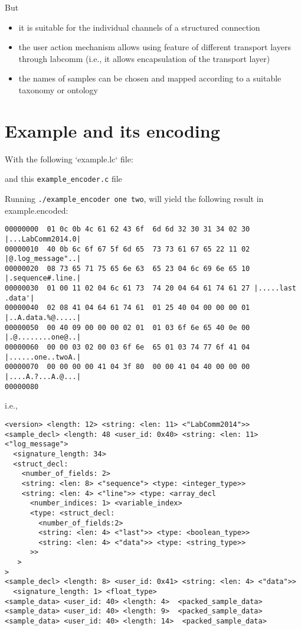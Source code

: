\documentclass[a4paper]{article}
\begin{document}
But

\begin{itemize}
\item it is suitable for the individual channels of a structured connection
\item the user action mechanism allows using feature of different transport layers
  through labcomm (i.e., it allows encapsulation of the transport layer)
\item the names of samples can be chosen and mapped according to a suitable taxonomy or ontology
\end{itemize}



\section{Example and its encoding}

With the following `example.lc` file:


and this \verb+example_encoder.c+ file



Running \verb+./example_encoder one two+, will yield the following result in example.encoded:
\begin{verbatim}
00000000  01 0c 0b 4c 61 62 43 6f  6d 6d 32 30 31 34 02 30 |...LabComm2014.0|
00000010  40 0b 6c 6f 67 5f 6d 65  73 73 61 67 65 22 11 02 |@.log_message"..|
00000020  08 73 65 71 75 65 6e 63  65 23 04 6c 69 6e 65 10 |.sequence#.line.|
00000030  01 00 11 02 04 6c 61 73  74 20 04 64 61 74 61 27 |.....last .data'|
00000040  02 08 41 04 64 61 74 61  01 25 40 04 00 00 00 01 |..A.data.%@.....|
00000050  00 40 09 00 00 00 02 01  01 03 6f 6e 65 40 0e 00 |.@........one@..|
00000060  00 00 03 02 00 03 6f 6e  65 01 03 74 77 6f 41 04 |......one..twoA.|
00000070  00 00 00 00 41 04 3f 80  00 00 41 04 40 00 00 00 |....A.?...A.@...|
00000080
\end{verbatim}

i.e.,
\begin{verbatim}
<version> <length: 12> <string: <len: 11> <"LabComm2014">>
<sample_decl> <length: 48 <user_id: 0x40> <string: <len: 11> <"log_message">
  <signature_length: 34>
  <struct_decl:
    <number_of_fields: 2>
    <string: <len: 8> <"sequence"> <type: <integer_type>>
    <string: <len: 4> <"line">> <type: <array_decl
      <number_indices: 1> <variable_index>
      <type: <struct_decl:
        <number_of_fields:2>
        <string: <len: 4> <"last">> <type: <boolean_type>>
        <string: <len: 4> <"data">> <type: <string_type>>
      >>
   >
>
<sample_decl> <length: 8> <user_id: 0x41> <string: <len: 4> <"data">>
  <signature_length: 1> <float_type>
<sample_data> <user_id: 40> <length: 4>  <packed_sample_data>
<sample_data> <user_id: 40> <length: 9>  <packed_sample_data>
<sample_data> <user_id: 40> <length: 14>  <packed_sample_data>
\end{verbatim}
\end{document}
